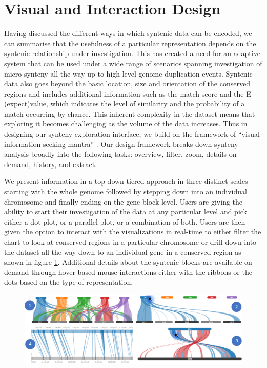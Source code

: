 \section{Visual and Interaction Design}

Having discussed the different ways in which syntenic data can be encoded, we can summarise that the usefulness of a particular representation depends on the syntenic relationship under investigation. This has created a need for an adaptive system that can be used under a wide range of scenarios spanning investigation of micro synteny all the way up to high-level genome duplication events. Syntenic data also goes beyond the basic location, size and orientation of the conserved regions and includes additional information such as the match score and the E (expect)value, which indicates the level of similarity and the probability of a match occurring by chance. This inherent complexity in the dataset means that exploring it becomes challenging as the volume of the data increases. Thus in designing our synteny exploration interface, we build on the framework of ``visual information seeking mantra'' \cite{Shneiderman96theeyes}. Our design framework breaks down synteny analysis broadly into the following tasks: overview, filter, zoom, details-on-demand, history, and extract.

We present information in a top-down tiered approach in three distinct scales starting with the whole genome followed by stepping down into an individual chromosome and finally ending on the gene block level. Users are giving the ability to start their investigation of the data at any particular level and pick either a dot plot, or a parallel plot, or a combination of both. Users are then given the option to interact with the visualizations in real-time to either filter the chart to look at conserved regions in a particular chromosome or drill down into the dataset all the way down to an individual gene in a conserved region as shown in figure \ref{fig:ch_4_exploration_through_interaction}. Additional details about the syntenic blocks are available on-demand through hover-based mouse interactions either with the ribbons or the dots based on the type of representation.

\begin{figure}[h]
  \centering
  \includegraphics[width=1\linewidth]{images/ch_4_exploration_through_interaction.PNG}
  \label{fig:ch_4_exploration_through_interaction}
\end{figure}


